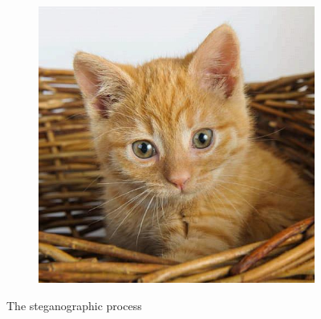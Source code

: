 \begin{figure}[]
	\begin{subfigure}[b]{.4\linewidth}
		\includegraphics[width=.97\textwidth]{sections/pictures/encrypted.jpg}
		\label{img3}
	\end{subfigure}
	\caption{The steganographic process}\label{LSBDemo}
\end{figure} 


